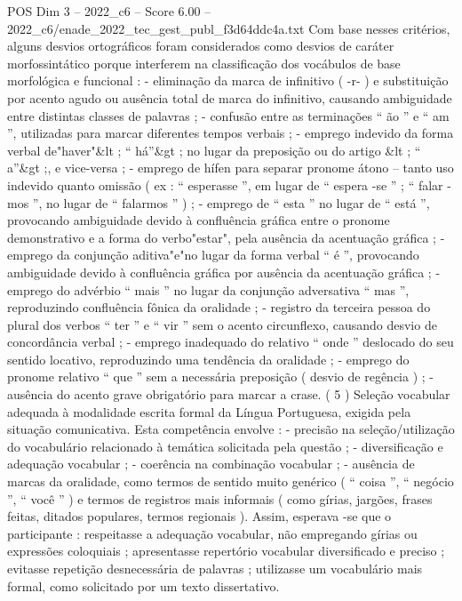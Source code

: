 \begin{textsample}{POS Dim 3 – 2022\_c6 – Score 6.00 – 2022\_c6/enade\_2022\_tec\_gest\_publ\_f3d64ddc4a.txt}
Com base nesses critérios, alguns desvios ortográficos foram considerados como desvios de caráter morfossintático porque interferem na classificação dos vocábulos de base morfológica e funcional : - eliminação da marca de infinitivo ( -r- ) e substituição por acento agudo ou ausência total de marca do infinitivo, causando ambiguidade entre distintas classes de palavras ; - confusão entre as terminações “ ão ” e “ am ”, utilizadas para marcar diferentes tempos verbais ; - emprego indevido da forma verbal de"haver"\&lt ; “ há”\&gt ; no lugar da preposição ou do artigo \&lt ; “ a”\&gt ;, e vice-versa ; - emprego de hífen para separar pronome átono – tanto uso indevido quanto omissão ( ex : “ esperasse ”, em lugar de “ espera -se ” ; “ falar -mos ”, no lugar de “ falarmos ” ) ; - emprego de “ esta ” no lugar de “ está ”, provocando ambiguidade devido à confluência gráfica entre o pronome demonstrativo e a forma do verbo"estar", pela ausência da acentuação gráfica ; - emprego da conjunção aditiva"e"no lugar da forma verbal “ é ”, provocando ambiguidade devido à confluência gráfica por ausência da acentuação gráfica ; - emprego do advérbio “ mais ” no lugar da conjunção adversativa “ mas ”, reproduzindo confluência fônica da oralidade ; - registro da terceira pessoa do plural dos verbos “ ter ” e “ vir ” sem o acento circunflexo, causando desvio de concordância verbal ; - emprego inadequado do relativo “ onde ” deslocado do seu sentido locativo, reproduzindo uma tendência da oralidade ; - emprego do pronome relativo “ que ” sem a necessária preposição ( desvio de regência ) ; - ausência do acento grave obrigatório para marcar a crase. ( 5 ) Seleção vocabular adequada à modalidade escrita formal da Língua Portuguesa, exigida pela situação comunicativa.
Esta competência envolve : - precisão na seleção/utilização do vocabulário relacionado à temática solicitada pela questão ; - diversificação e adequação vocabular ; - coerência na combinação vocabular ; - ausência de marcas da oralidade, como termos de sentido muito genérico ( “ coisa ”, “ negócio ”, “ você ” ) e termos de registros mais informais ( como gírias, jargões, frases feitas, ditados populares, termos regionais ).
Assim, esperava -se que o participante : respeitasse a adequação vocabular, não empregando gírias ou expressões coloquiais ; apresentasse repertório vocabular diversificado e preciso ; evitasse repetição desnecessária de palavras ; utilizasse um vocabulário mais formal, como solicitado por um texto dissertativo.

\end{textsample}

